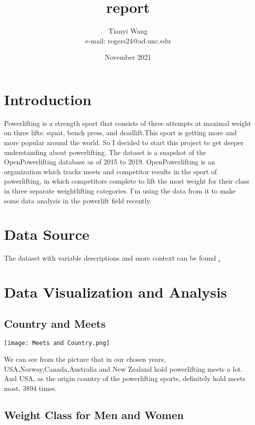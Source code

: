 \documentclass{article}
\title{report}
\author{Tianyi Wang \\ e-mail: rogers24@ad.unc.edu}
\date{November 2021}
\begin{document}
\maketitle

\section{Introduction}

Powerlifting is a strength sport that consists of three attempts at maximal weight on three lifts: squat, bench press, and deadlift.This sport is getting more and more popular around the world. So I decided to start this project to get deeper understanding about powerlifting. The dataset is a snapshot of the OpenPowerlifting database as of 2015 to 2019. OpenPowerlifting is an organization which tracks meets and competitor results in the sport of powerlifting, in which competitors complete to lift the most weight for their class in three separate weightlifting categories. I'm using the data from it to make some data analysis in the powerlift field recently.

\section{Data Source}

The dataset with variable descriptions and more context can be found \href{https://www.kaggle.com/open-powerlifting/powerlifting-database}.

\section{Data Visualization and Analysis}

\subsection{Country and Meets}

\texttt{[image: Meets and Country.png]}

We can see from the picture that in our chosen years, USA,Norway,Canada,Australia and New Zealand hold powerlifting meets a lot. And USA, as the origin country of the powerlifting sports, definitely hold meets most, 3894 times. 


\subsection{Weight Class for Men and Women}
\end{document}
